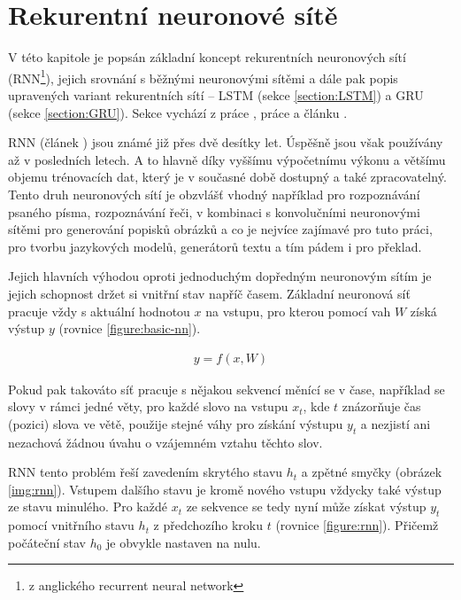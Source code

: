 \section{Rekurentní neuronové sítě}\label{section:rnn}
V této kapitole je popsán základní koncept rekurentních neuronových sítí (RNN\footnote{z anglického recurrent neural network}), jejich srovnání s běžnými neuronovými sítěmi a dále pak popis upravených variant rekurentních sítí -- LSTM (sekce \ref{section:LSTM}) a GRU (sekce \ref{section:GRU}). Sekce vychází z práce \cite{nmtThesis}, práce \cite{nmtTutorial} a článku \cite{understandingLSTM}.


RNN (článek \cite{rnn}) jsou známé již přes dvě desítky let. Úspěšně jsou však používány až v posledních letech. A to hlavně díky vyššímu výpočetnímu výkonu a většímu objemu trénovacích dat, který je v současné době dostupný a také zpracovatelný. Tento druh neuronových sítí je obzvlášť vhodný například pro rozpoznávání psaného písma, rozpoznávání řeči, v kombinaci s konvolučními neuronovými sítěmi pro generování popisků obrázků a co je nejvíce zajímavé pro tuto práci, pro tvorbu jazykových modelů, generátorů textu a tím pádem i pro překlad.

Jejich hlavních výhodou oproti jednoduchým dopředným neuronovým sítím je jejich schopnost držet si vnitřní stav napříč časem. Základní neuronová síť pracuje vždy s aktuální hodnotou $x$ na vstupu, pro kterou pomocí vah $W$ získá výstup $y$ (rovnice \ref{figure:basic-nn}).

\begin{align}\label{figure:basic-nn}
  y = f (x, W)
\end{align}

Pokud pak takováto síť pracuje s nějakou sekvencí měnící se v čase, například se slovy v rámci jedné věty, pro každé slovo na vstupu $x_t$, kde $t$ znázorňuje čas (pozici) slova ve větě, použije stejné váhy pro získání výstupu $y_t$ a nezjistí ani nezachová žádnou úvahu o vzájemném vztahu těchto slov.

RNN tento problém řeší zavedením skrytého stavu $h_t$ a zpětné smyčky (obrázek \ref{img:rnn}). Vstupem dalšího stavu je kromě nového vstupu vždycky také výstup ze stavu minulého. Pro každé $x_t$ ze sekvence se tedy nyní může získat výstup $y_t$ pomocí vnitřního stavu $h_t$ z předchozího kroku $t$ (rovnice \ref{figure:rnn}). Přičemž počáteční stav  $h_0$ je obvykle nastaven na nulu.


